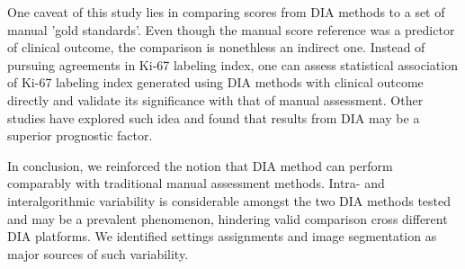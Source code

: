 \documentclass[final,1p,times]{elsarticle}
\begin{document}
One caveat of this study lies in comparing scores from DIA methods to a set of manual {'gold standards'}. Even though the manual score reference was a predictor of clinical outcome, the comparison is nonethless an indirect one. Instead of pursuing agreements in Ki-67 labeling index, one can assess statistical association of Ki-67 labeling index generated using DIA methods with clinical outcome directly and validate its significance with that of manual assessment. Other studies have explored such idea and found that results from DIA may be a superior prognostic factor. \cite{Stalhammar2016}

In conclusion, we reinforced the notion that DIA method can perform comparably with traditional manual assessment methods. Intra- and interalgorithmic variability is considerable amongst the two DIA methods tested and may be a prevalent phenomenon, hindering valid comparison cross different DIA platforms. We identified settings assignments and image segmentation as major sources of such variability.



\printbibliography
\end{document}

